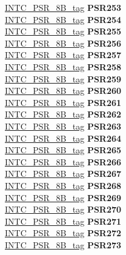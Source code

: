 \begin{DoxyCompactItemize}
\begin{tabbing}
\>\>\mbox{\hyperlink{unionINTC__PSR__8B__tag}{INTC\_PSR\_8B\_tag}} {\bfseries PSR253}\\
\>\>\mbox{\hyperlink{unionINTC__PSR__8B__tag}{INTC\_PSR\_8B\_tag}} {\bfseries PSR254}\\
\>\>\mbox{\hyperlink{unionINTC__PSR__8B__tag}{INTC\_PSR\_8B\_tag}} {\bfseries PSR255}\\
\>\>\mbox{\hyperlink{unionINTC__PSR__8B__tag}{INTC\_PSR\_8B\_tag}} {\bfseries PSR256}\\
\>\>\mbox{\hyperlink{unionINTC__PSR__8B__tag}{INTC\_PSR\_8B\_tag}} {\bfseries PSR257}\\
\>\>\mbox{\hyperlink{unionINTC__PSR__8B__tag}{INTC\_PSR\_8B\_tag}} {\bfseries PSR258}\\
\>\>\mbox{\hyperlink{unionINTC__PSR__8B__tag}{INTC\_PSR\_8B\_tag}} {\bfseries PSR259}\\
\>\>\mbox{\hyperlink{unionINTC__PSR__8B__tag}{INTC\_PSR\_8B\_tag}} {\bfseries PSR260}\\
\>\>\mbox{\hyperlink{unionINTC__PSR__8B__tag}{INTC\_PSR\_8B\_tag}} {\bfseries PSR261}\\
\>\>\mbox{\hyperlink{unionINTC__PSR__8B__tag}{INTC\_PSR\_8B\_tag}} {\bfseries PSR262}\\
\>\>\mbox{\hyperlink{unionINTC__PSR__8B__tag}{INTC\_PSR\_8B\_tag}} {\bfseries PSR263}\\
\>\>\mbox{\hyperlink{unionINTC__PSR__8B__tag}{INTC\_PSR\_8B\_tag}} {\bfseries PSR264}\\
\>\>\mbox{\hyperlink{unionINTC__PSR__8B__tag}{INTC\_PSR\_8B\_tag}} {\bfseries PSR265}\\
\>\>\mbox{\hyperlink{unionINTC__PSR__8B__tag}{INTC\_PSR\_8B\_tag}} {\bfseries PSR266}\\
\>\>\mbox{\hyperlink{unionINTC__PSR__8B__tag}{INTC\_PSR\_8B\_tag}} {\bfseries PSR267}\\
\>\>\mbox{\hyperlink{unionINTC__PSR__8B__tag}{INTC\_PSR\_8B\_tag}} {\bfseries PSR268}\\
\>\>\mbox{\hyperlink{unionINTC__PSR__8B__tag}{INTC\_PSR\_8B\_tag}} {\bfseries PSR269}\\
\>\>\mbox{\hyperlink{unionINTC__PSR__8B__tag}{INTC\_PSR\_8B\_tag}} {\bfseries PSR270}\\
\>\>\mbox{\hyperlink{unionINTC__PSR__8B__tag}{INTC\_PSR\_8B\_tag}} {\bfseries PSR271}\\
\>\>\mbox{\hyperlink{unionINTC__PSR__8B__tag}{INTC\_PSR\_8B\_tag}} {\bfseries PSR272}\\
\>\>\mbox{\hyperlink{unionINTC__PSR__8B__tag}{INTC\_PSR\_8B\_tag}} {\bfseries PSR273}\\

\end{tabbing}
\end{DoxyCompactItemize}
